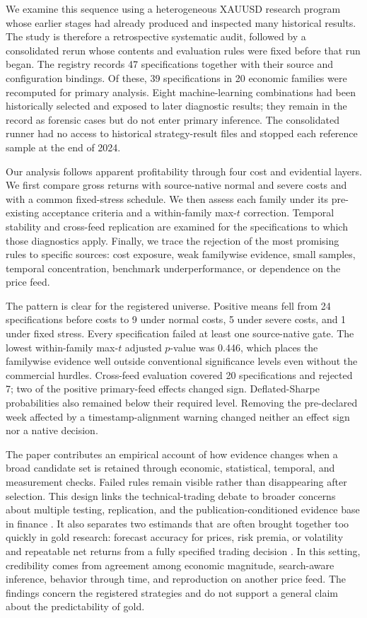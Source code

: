 We examine this sequence using a heterogeneous XAUUSD research program whose earlier stages had already produced and inspected many historical results. The study is therefore a retrospective systematic audit, followed by a consolidated rerun whose contents and evaluation rules were fixed before that run began. The registry records 47 specifications together with their source and configuration bindings. Of these, 39 specifications in 20 economic families were recomputed for primary analysis. Eight machine-learning combinations had been historically selected and exposed to later diagnostic results; they remain in the record as forensic cases but do not enter primary inference. The consolidated runner had no access to historical strategy-result files and stopped each reference sample at the end of 2024.

Our analysis follows apparent profitability through four cost and evidential layers. We first compare gross returns with source-native normal and severe costs and with a common fixed-stress schedule. We then assess each family under its pre-existing acceptance criteria and a within-family max-$t$ correction. Temporal stability and cross-feed replication are examined for the specifications to which those diagnostics apply. Finally, we trace the rejection of the most promising rules to specific sources: cost exposure, weak familywise evidence, small samples, temporal concentration, benchmark underperformance, or dependence on the price feed.

The pattern is clear for the registered universe. Positive means fell from 24 specifications before costs to 9 under normal costs, 5 under severe costs, and 1 under fixed stress. Every specification failed at least one source-native gate. The lowest within-family max-$t$ adjusted $p$-value was 0.446, which places the familywise evidence well outside conventional significance levels even without the commercial hurdles. Cross-feed evaluation covered 20 specifications and rejected 7; two of the positive primary-feed effects changed sign. Deflated-Sharpe probabilities also remained below their required level. Removing the pre-declared week affected by a timestamp-alignment warning changed neither an effect sign nor a native decision.

The paper contributes an empirical account of how evidence changes when a broad candidate set is retained through economic, statistical, temporal, and measurement checks. Failed rules remain visible rather than disappearing after selection. This design links the technical-trading debate to broader concerns about multiple testing, replication, and the publication-conditioned evidence base in finance \citep{harvey2016,mclean2016,hou2020}. It also separates two estimands that are often brought together too quickly in gold research: forecast accuracy for prices, risk premia, or volatility and repeatable net returns from a fully specified trading decision \citep{cohen2023,diaz2023,you2025}. In this setting, credibility comes from agreement among economic magnitude, search-aware inference, behavior through time, and reproduction on another price feed. The findings concern the registered strategies and do not support a general claim about the predictability of gold.

